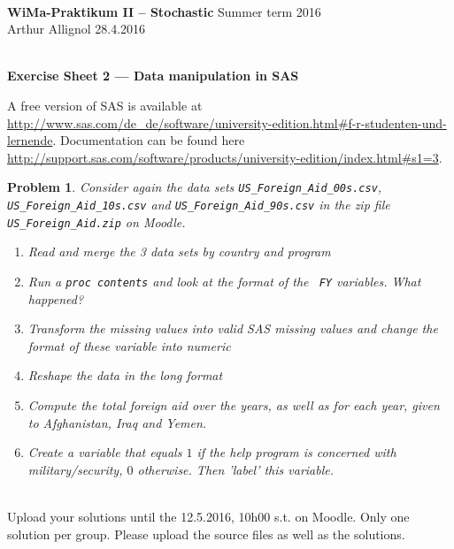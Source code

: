 \documentclass[a4,11pt]{article}\usepackage[]{graphicx}\usepackage[]{color}
\newcounter{ka}
\newtheorem{exercise}{Problem}
\newenvironment{aufgabe}{\begin{exercise}\sf}{\end{exercise} \bigskip}
\newcommand{\footer}{ \vfill
  \mbox{}\hrulefill\\
  Upload your solutions until the 12.5.2016, 10h00 s.t. on
  Moodle. Only one solution per group. Please upload the source files
  as well as the solutions.}
\begin{document}
\renewcommand{\baselinestretch}{1}

\hrulefill\\
{\bf WiMa-Praktikum II -- Stochastic} \hspace{\fill} Summer term 2016\\
Arthur Allignol \hspace{\fill} 28.4.2016\\[-1.2ex]
\mbox{}\hrulefill\\
\newline \renewcommand{\baselinestretch}{1}
\setcounter{ka}{0} \vspace{-0.5cm}



\begin{center}
\large{{\bf Exercise Sheet 2 --- Data manipulation in SAS}}
\end{center}

A free version of SAS is available at
\url{http://www.sas.com/de_de/software/university-edition.html#f-r-studenten-und-lernende}. 
Documentation can be found here 
\url{http://support.sas.com/software/products/university-edition/index.html#s1=3}.

\begin{aufgabe}
  Consider again the data sets {\tt US\_Foreign\_Aid\_00s.csv}, {\tt
    US\_Foreign\_Aid\_10s.csv} and {\tt US\_Foreign\_Aid\_90s.csv} in the
  zip file {\tt US\_Foreign\_Aid.zip} on Moodle. 
  
  \begin{enumerate}
  \item Read and merge the 3 data sets by country and program
  \item Run a {\tt proc contents} and look at the format of the {\tt
      FY} variables. What happened?
  \item Transform the missing values into valid SAS missing values and
    change the format of these variable into numeric
  \item Reshape the data in the long format
  \item Compute the total foreign aid over the years, as well as for each
    year, given to Afghanistan, Iraq and Yemen.
  \item Create a variable that equals $1$ if the help program is concerned
    with military/security, $0$ otherwise. Then 'label' this variable.
  \end{enumerate}
  
  
\end{aufgabe}

\footer
\end{document}
